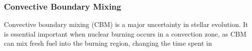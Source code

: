 {\color{purple}
\subsubsection{Convective Boundary Mixing}
}


Convective boundary mixing (CBM) is a major uncertainty in stellar evolution. It is essential important when nuclear burning occurs in a convection zone, as CBM can mix fresh fuel into the burning region, changing the time spent in 

